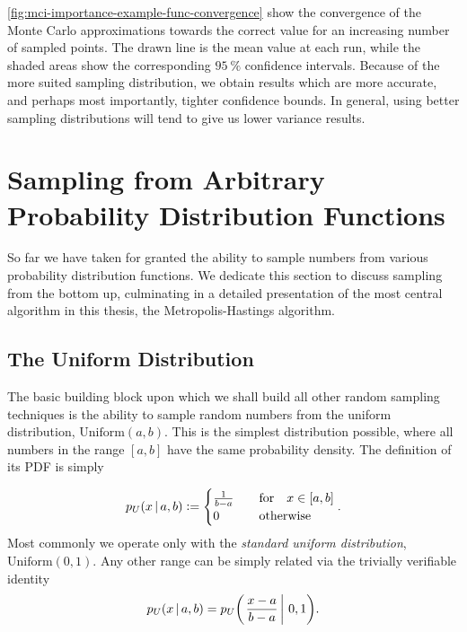 \documentclass[Thesis.tex]{subfiles}
\begin{document}
\autoref{fig:mci-importance-example-func-convergence} show the convergence of
the Monte Carlo approximations towards the correct value for an increasing
number of sampled points. The drawn line is the mean value at each run, while
the shaded areas show the corresponding $\SI{95}{\percent}$ confidence
intervals. Because of the more suited sampling distribution, we obtain results
which are more accurate, and perhaps most importantly, tighter confidence
bounds. In general, using better sampling distributions will tend to give us
lower variance results.

\section{Sampling from Arbitrary Probability Distribution Functions}

So far we have taken for granted the ability to sample numbers from various
probability distribution functions. We dedicate this section to discuss sampling from the bottom up, culminating in a detailed presentation of the most central algorithm in this thesis, the Metropolis-Hastings algorithm.

\subsection{The Uniform Distribution}

The basic building block upon which we shall build all other random sampling
techniques is the ability to sample random numbers from the uniform
distribution, $\text{Uniform}(a, b)$. This is the simplest distribution
possible, where all numbers in the range $[a, b]$ have the same probability
density. The definition of its PDF is simply

\begin{align}\label{eq:uniform-pdf-definition}
    p_U(x\,|\, a, b) \defeq  \begin{cases}
        \frac{1}{b - a} &\qfor x\in [a, b]\\
        0&\qotherwise
    \end{cases}.
\end{align}
Most commonly we operate only with the \emph{standard uniform distribution}, $\text{Uniform}(0, 1)$. Any other range can be simply related via the trivially verifiable identity
\begin{align}
    p_U(x\,|\, a,b) = p_U\qty(\left. \frac{x-a}{b-a} \,\right|\, 0, 1).
\end{align}
\end{document}
